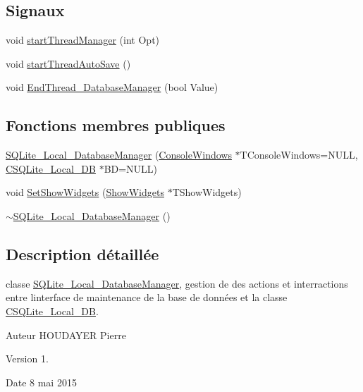 \subsection*{Signaux}
\begin{DoxyCompactItemize}
\item 
void \hyperlink{class_s_q_lite___local___database_manager_ad8c9e0f685b0d37c99952d68bf9c3bf6}{start\+Thread\+Manager} (int Opt)
\item 
void \hyperlink{class_s_q_lite___local___database_manager_a5ac47d06629c2913972b0db86cb80c1c}{start\+Thread\+Auto\+Save} ()
\item 
void \hyperlink{class_s_q_lite___local___database_manager_a83ec01b1efdd59cd74af2a987e7b393d}{End\+Thread\+\_\+\+Database\+Manager} (bool Value)
\end{DoxyCompactItemize}
\subsection*{Fonctions membres publiques}
\begin{DoxyCompactItemize}
\item 
\hyperlink{class_s_q_lite___local___database_manager_a7d002283954a928e19a37340f18ba6f5}{S\+Q\+Lite\+\_\+\+Local\+\_\+\+Database\+Manager} (\hyperlink{class_console_windows}{Console\+Windows} $\ast$T\+Console\+Windows=N\+U\+L\+L, \hyperlink{class_c_s_q_lite___local___d_b}{C\+S\+Q\+Lite\+\_\+\+Local\+\_\+\+D\+B} $\ast$B\+D=N\+U\+L\+L)
\item 
void \hyperlink{class_s_q_lite___local___database_manager_a6d37c800647d0714a8497722d65f1538}{Set\+Show\+Widgets} (\hyperlink{class_show_widgets}{Show\+Widgets} $\ast$T\+Show\+Widgets)
\item 
\hyperlink{class_s_q_lite___local___database_manager_ab1ab69099124f5db722ef84049d79efc}{$\sim$\+S\+Q\+Lite\+\_\+\+Local\+\_\+\+Database\+Manager} ()
\end{DoxyCompactItemize}


\subsection{Description détaillée}
classe \hyperlink{class_s_q_lite___local___database_manager}{S\+Q\+Lite\+\_\+\+Local\+\_\+\+Database\+Manager}, gestion de des actions et interractions entre l\textquotesingle{}interface de maintenance de la base de données et la classe \hyperlink{class_c_s_q_lite___local___d_b}{C\+S\+Q\+Lite\+\_\+\+Local\+\_\+\+D\+B}. 

\begin{DoxyAuthor}{Auteur}
H\+O\+U\+D\+A\+Y\+E\+R Pierre
\end{DoxyAuthor}
\begin{DoxyVersion}{Version}
1.
\end{DoxyVersion}
\begin{DoxyDate}{Date}
8 mai 2015 
\end{DoxyDate}


